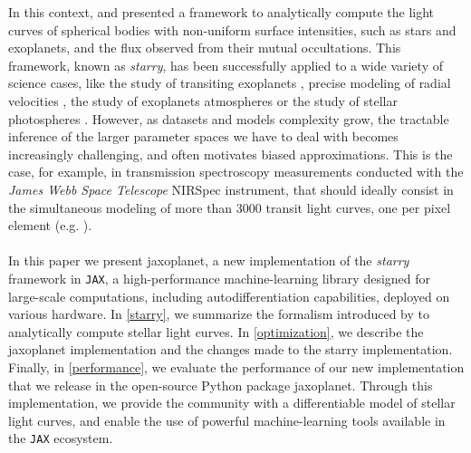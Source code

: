 \documentclass[modern]{aastex631}
\begin{document}
In this context, \cite{starry} and \cite{Agol2020} presented a framework to analytically compute the light curves of spherical bodies with non-uniform surface intensities, such as stars and exoplanets, and the flux observed from their mutual occultations. This framework, known as \textit{starry}, has been successfully applied to a wide variety of science cases, like the study of transiting exoplanets \citep{Kostov2019}, precise modeling of radial velocities \citep{Dawson2021}, the study of exoplanets atmospheres \citep{Bell2023} or the study of stellar photospheres \citep{Almenara2022}. However, as datasets and models complexity grow, the tractable inference of the larger parameter spaces we have to deal with becomes increasingly challenging, and often motivates biased approximations. This is the case, for example, in transmission spectroscopy measurements conducted with the \textit{James Webb Space Telescope} NIRSpec instrument, that should ideally consist in the simultaneous modeling of more than 3000 transit light curves, one per pixel element (e.g. \citealt{Alderson2023}).\\\\
In this paper we present \textsf{jaxoplanet}, a new implementation of the \textit{starry} framework in \texttt{JAX}, a high-performance machine-learning library designed for large-scale computations, including autodifferentiation capabilities, deployed on various hardware. In \autoref{starry}, we summarize the formalism introduced by \cite{starry} to analytically compute stellar light curves. In \autoref{optimization}, we describe the \textsf{jaxoplanet} implementation and the changes made to the \textsf{starry} implementation. Finally, in \autoref{performance}, we evaluate the performance of our new implementation that we release in the open-source Python package \textsf{jaxoplanet}. Through this implementation, we provide the community with a differentiable model of stellar light curves, and enable the use of powerful machine-learning tools available in the \texttt{JAX} ecosystem.\\\\





\end{document}
